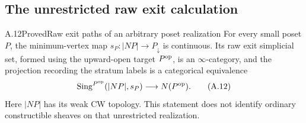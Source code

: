 \subsection{The unrestricted raw exit calculation}

\begin{statement}{A.12}{Proved}{Raw exit paths of an arbitrary poset realization}
For every small poset $P$, the minimum-vertex map
$s_P:|NP|\to P_{\downarrow}$ is continuous. Its raw exit simplicial set,
formed using the upward-open target $P^{\mathrm{op}}$, is an $\infty$-category,
and the projection recording the stratum labels is a categorical
equivalence
\[
 \operatorname{Sing}^{P^{\mathrm{op}}}(|NP|,s_P)
       \longrightarrow N(P^{\mathrm{op}}).
\tag{A.12}
\]
Here $|NP|$ has its weak CW topology. This statement does not identify
ordinary constructible sheaves on that unrestricted realization.
\end{statement}
